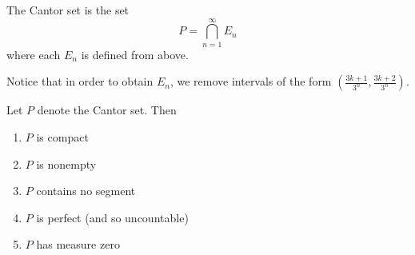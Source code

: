\begin{definition}
    The Cantor set is the set
    $$P= \bigcap \limits_{n=1}^\infty E_n$$
    where each $E_n$ is defined from above.
\end{definition}

\begin{observation}
    Notice that in order to obtain $E_n$, we remove intervals of the form $(\frac{3k+1}{3^n}, \frac{3k+2}{3^n})$.
\end{observation}

\begin{theorem}
Let $P$ denote the Cantor set. Then
\begin{enumerate}[$(i)$]
    \item $P$ is compact
    \item $P$ is nonempty
    \item $P$ contains no segment
    \item $P$ is perfect (and so uncountable)
    \item $P$ has measure zero
\end{enumerate}    
\end{theorem}
